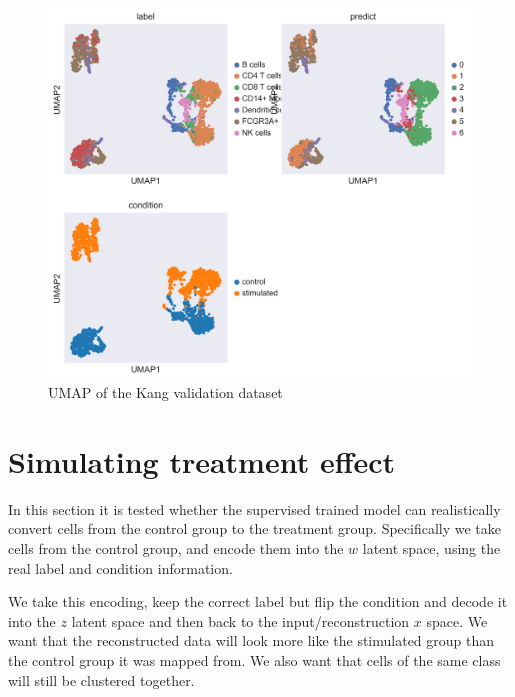 \documentclass[11pt, a4paper]{report}
\theoremstyle{plain}
\theoremstyle{definition}
\theoremstyle{remark}
\begin{document}
\begin{figure}[h]
\centering
\includegraphics[width=1.1\textwidth]{images/Kang_super_val_umap.png}
\caption{UMAP of the Kang validation dataset
}
\label{fig:Kang_super_val_umap}
\end{figure}

\section{Simulating treatment effect}

In this section it is tested whether the supervised trained model can
realistically convert cells from the control group to the treatment group.
Specifically we take cells from the control group, and encode them into the $w$
latent space, using the real label and condition information.

We take this encoding, keep the correct label but flip the condition and decode
it into the $z$ latent space and then back to the input/reconstruction $x$ space.
We want that the reconstructed data will look more like the stimulated group
than the control group it was mapped from. We also want that cells of the same
class will still be clustered together.
\end{document}

